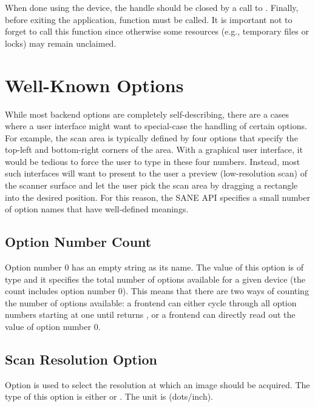 \documentclass[11pt,DVIps]{report}
\begin{document}
When done using the device, the handle should be closed by a call to
.  Finally, before exiting the application,
function  must be called.  It is important not to
forget to call this function since otherwise some resources (e.g.,
temporary files or locks) may remain unclaimed.


\section{Well-Known Options}

While most backend options are completely self-describing, there are a
cases where a user interface might want to special-case the handling
of certain options.  For example, the scan area is typically defined
by four options that specify the top-left and bottom-right corners of
the area.  With a graphical user interface, it would be tedious to
force the user to type in these four numbers.  Instead, most such
interfaces will want to present to the user a preview (low-resolution
scan) of the scanner surface and let the user pick the scan area by
dragging a rectangle into the desired position.  For this reason, the
SANE API specifies a small number of option names that have
well-defined meanings.

\subsection{Option Number Count}

Option number 0 has an empty string as its name.  The value of this
option is of type  and it specifies the total
number of options available for a given device (the count includes
option number 0).  This means that there are two ways of counting the
number of options available: a frontend can either cycle through all
option numbers starting at one until
 returns , or a
frontend can directly read out the value of option number 0.

\subsection{Scan Resolution Option}

Option  is used to select the resolution at which an
image should be acquired.  The type of this option is either
 or .  The unit is
 (dots/inch).
\end{document}
